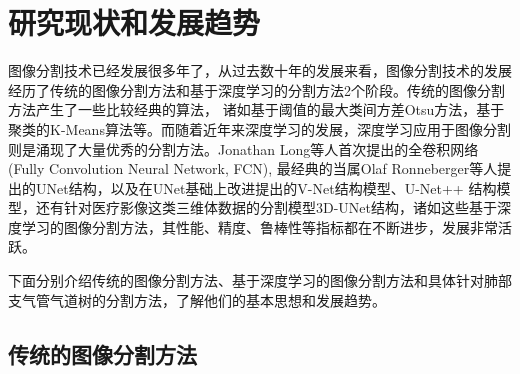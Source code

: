 \section{研究现状和发展趋势}


图像分割技术已经发展很多年了，从过去数十年的发展来看，图像分割技术的发展经历了传统的图像分割方法和基于深度学习的分割方法2个阶段。传统的图像分割方法产生了一些比较经典的算法，
诸如基于阈值的最大类间方差Otsu方法\cite{otsu1979threshold}，基于聚类的K-Means算法\cite{macqueen1965some}等。而随着近年来深度学习的发展，深度学习应用于图像分割
则是涌现了大量优秀的分割方法。Jonathan Long等人\cite{long2015fully}首次提出的全卷积网络(Fully Convolution Neural Network, FCN), 最经典的当属Olaf Ronneberger等人\cite{ronneberger2015u}提出的UNet结构，以及在UNet基础上改进提出的V-Net\cite{milletari2016v}结构模型、U-Net++\cite{zhou2019unet++}
结构模型，还有针对医疗影像这类三维体数据的分割模型3D-UNet结构\cite{cciccek20163d}，诸如这些基于深度学习的图像分割方法，其性能、精度、鲁棒性等指标都在不断进步，发展非常活跃。

下面分别介绍传统的图像分割方法、基于深度学习的图像分割方法和具体针对肺部支气管气道树的分割方法，了解他们的基本思想和发展趋势。

	\subsection{传统的图像分割方法}
	
